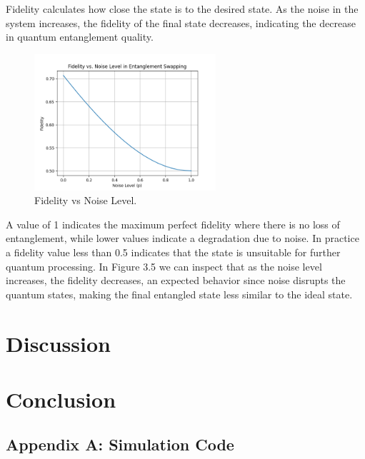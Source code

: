\documentclass[12pt,a4paper] {report}
\begin{document}
		Fidelity calculates how close the state is to the desired state. 
		As the noise in the system increases, the fidelity of the final state decreases,
		indicating the decrease in quantum entanglement quality.

		\begin{figure}[h!]
			\centering
			\includegraphics[width=0.6\textwidth]{repeater/fid_vs_noise.png}
			\caption{Fidelity vs Noise Level.}
			\label{fig:}
		\end{figure}		

		A value of 1 indicates the maximum perfect fidelity where there is no loss of entanglement, 
		while lower values indicate a degradation due to noise.
		In practice a fidelity value less than 0.5 indicates that the state is unsuitable for further quantum processing.
		In Figure 3.5 we can inspect that as the noise level increases, the fidelity decreases,
		an expected behavior since noise disrupts the quantum states,
		making the final entangled state less similar to the ideal state.




	\chapter{Discussion}

	\chapter{Conclusion}





\newpage
\appendix

\section*{Appendix A: Simulation Code }
\end{document}
